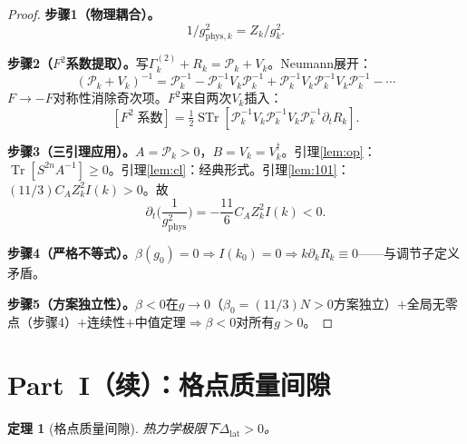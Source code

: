 \documentclass[12pt,a4paper]{article}
\theoremstyle{plain}
\newtheorem{theorem}{定理}[section]
\theoremstyle{definition}
\theoremstyle{remark}
\begin{document}
\begin{proof}
\textbf{步骤1（物理耦合）。}
\begin{equation}\label{eq:gphys}
1/g_{\mathrm{phys},k}^2 = Z_k/g_k^2.
\end{equation}

\textbf{步骤2（$F^2$系数提取）。}写$\Gamma_k^{(2)}+R_k=\mathcal{P}_k+V_k$。Neumann展开：
\begin{equation}\label{eq:Neumann}
(\mathcal{P}_k+V_k)^{-1} = \mathcal{P}_k^{-1}-\mathcal{P}_k^{-1}V_k\mathcal{P}_k^{-1}+\mathcal{P}_k^{-1}V_k\mathcal{P}_k^{-1}V_k\mathcal{P}_k^{-1}-\cdots
\end{equation}
$F\to -F$对称性消除奇次项。$F^2$来自两次$V_k$插入：
\begin{equation}\label{eq:F2trace}
[F^2\;\text{系数}] = \tfrac{1}{2}\operatorname{STr}[\mathcal{P}_k^{-1}V_k\mathcal{P}_k^{-1}V_k\mathcal{P}_k^{-1}\partial_tR_k].
\end{equation}

\textbf{步骤3（三引理应用）。}$A=\mathcal{P}_k>0$，$B=V_k=V_k^\dagger$。引理\ref{lem:op}：$\operatorname{Tr}[S^{2n}A^{-1}]\geq 0$。引理\ref{lem:cl}：经典形式。引理\ref{lem:101}：$(11/3)C_AZ_k^2I(k)>0$。故
\begin{equation}\label{eq:betaflow}
\partial_t\!\Big(\frac{1}{g_{\mathrm{phys}}^2}\Big) = -\frac{11}{6}C_AZ_k^2I(k) < 0.
\end{equation}

\textbf{步骤4（严格不等式）。}$\beta(g_0)=0\Rightarrow I(k_0)=0\Rightarrow k\partial_kR_k\equiv 0$——与调节子定义矛盾。

\textbf{步骤5（方案独立性）。}$\beta<0$在$g\to 0$（$\beta_0=(11/3)N>0$方案独立）$+$全局无零点（步骤4）$+$连续性$+$中值定理$\Rightarrow\beta<0$对所有$g>0$。
\end{proof}

\section{Part~I（续）：格点质量间隙}\label{sec:latgap}

\begin{theorem}[格点质量间隙]\label{thm:latgap}
热力学极限下$\Delta_{\mathrm{lat}}>0$。
\end{theorem}
\end{document}
